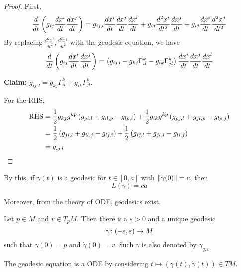 \begin{proof}
	First,
	\begin{equation*}
		\frac{d}{dt}\left(g_{ij}\frac{dx^i}{dt}\frac{dx^j}{dt}\right) = g_{ij,l}\frac{dx^i}{dt}\frac{dx^j}{dt}\frac{dx^l}{dt}+g_{ij}\frac{d^2x^i}{dt^2}\frac{dx^j}{dt}+g_{ij}\frac{dx^i}{dt}\frac{d^2x^j}{dt^2} 
	\end{equation*}
	By replacing $\frac{d^2x^i}{dt^2},\frac{d^2x^j}{dt^2}$ with the geodesic equation, we have
	\begin{equation*}
		\frac{d}{dt}\left(g_{ij}\frac{dx^i}{dt}\frac{dx^j}{dt}\right) = \left(g_{ij,l}-g_{kj}\Gamma^k_{il}-g_{ik}\Gamma^k_{jl}\right)\frac{dx^i}{dt}\frac{dx^j}{dt}\frac{dx^l}{dt}
	\end{equation*}
	
	\noindent\textbf{Claim:} $g_{ij,l}=g_{kj}\Gamma^k_{il}+g_{ik}\Gamma^k_{jl}$.

	\noindent For the RHS,
	\begin{equation*}
		\begin{aligned}
			\text{RHS} &= \frac{1}{2}g_{kj}g^{kp}\left(g_{pi,l}+g_{il,p}-g_{lp,i}\right) + \frac{1}{2}g_{ik}g^{kp}\left(g_{pj,l}+g_{jl,p}-g_{lp,j}\right) \\
			&=\frac{1}{2}\left(g_{ji,l}+g_{il,j}-g_{lj,i}\right) + \frac{1}{2}\left(g_{ij,l}+g_{jl,i}-g_{li,j}\right) \\
			&= g_{ij,l}
		\end{aligned}
	\end{equation*}
\end{proof}
\begin{rmk}
	By this, if $\gamma(t)$ is a geodesic for $t \in [0,a]$ with $\left\lVert\dot{\gamma}(0)\right\lVert = c$, then
	\begin{equation*}
		L(\gamma) = ca
	\end{equation*}
\end{rmk}

\noindent Moreover, from the theory of ODE, geodesics exist.
\begin{thm}
	Let $p \in M$ and $v \in T_pM$. Then there is a $\varepsilon > 0$ and a unique geodesic
	\begin{equation*}
		\gamma\colon (-\varepsilon,\varepsilon) \rightarrow M
	\end{equation*}
	such that $\gamma(0) = p$ and $\dot{\gamma}(0) = v$. Such $\gamma$ is also denoted by $\gamma_{q,v}$
\end{thm}
\begin{rmk}
	The geodesic equation is a ODE by considering $t \mapsto (\gamma(t),\dot{\gamma}(t)) \in TM$.
\end{rmk}

